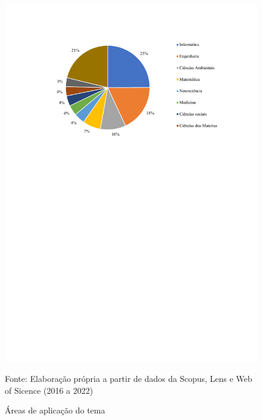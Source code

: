 \begin{figure}[htp!]
	\centering
	\caption{Áreas de aplicação do tema}
	\label{fig:areas}
	\includegraphics[width=0.9\linewidth]{Revisao/Figuras/areas}
	\vspace{0.2cm}
	
Fonte: Elaboração própria a partir de dados da Scopus, Lens e Web of Sicence (2016 a 2022)
\end{figure}
